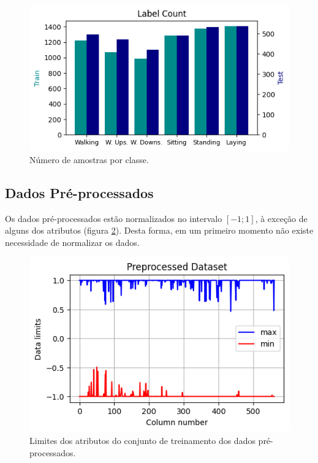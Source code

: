 \documentclass[final,5p]{elsarticle}
\numberwithin{equation}{section}
\begin{document}
        \begin{figure}[hbt!]
            \includegraphics[width=0.95\columnwidth]{A_LabelCount.png}
            \caption{Número de amostras por classe.}
            \label{fig:numero_por_classe}
        \end{figure}

    \subsection{Dados Pré-processados}

        Os dados pré-processados estão normalizados no intervalo $[-1;1]$, à exceção de alguns dos atributos (figura \ref{fig:dados_preprocessados}). Desta forma, em um primeiro momento não existe necessidade de normalizar os dados.

        \begin{figure}[hbt!]
            \includegraphics[width=0.95\columnwidth]{A_Dataset_Scale.png}
            \caption{Limites dos atributos do conjunto de treinamento dos dados pré-processados.}
            \label{fig:dados_preprocessados}
        \end{figure}
\end{document}
